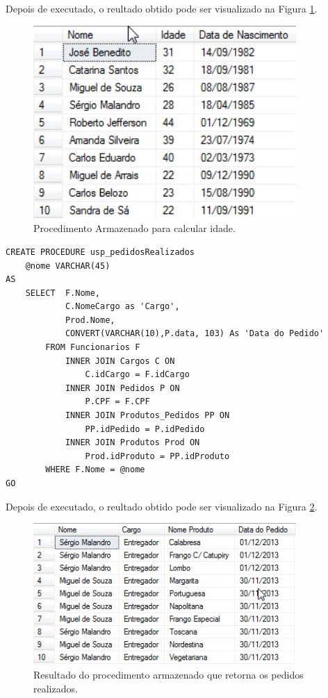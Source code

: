 \documentclass[
	12pt,				%
	openright,			%
	oneside,			%
	a4paper,			%
	chapter=TITLE,		%
	section=TITLE,		%
	english,			%
	brazil				%
	]{abntex2}
\begin{document}
    Depois de executado, o reultado obtido pode ser visualizado na Figura \ref{usp_001}.
    
    \begin{figure}[h]
         \centering
         \includegraphics[width=10cm,keepaspectratio]{Imgs/USP_001}
         \caption{Procedimento Armazenado para calcular idade.}
         \label{usp_001}
    \end{figure}
    
    \newpage
    
    \begin{lstlisting}
CREATE PROCEDURE usp_pedidosRealizados
	@nome VARCHAR(45)
AS
	SELECT  F.Nome, 
	        C.NomeCargo as 'Cargo', 
	        Prod.Nome, 
	        CONVERT(VARCHAR(10),P.data, 103) As 'Data do Pedido'  
        FROM Funcionarios F
            INNER JOIN Cargos C ON 
                C.idCargo = F.idCargo
            INNER JOIN Pedidos P ON 
                P.CPF = F.CPF
            INNER JOIN Produtos_Pedidos PP ON 
                PP.idPedido = P.idPedido
            INNER JOIN Produtos Prod ON 
                Prod.idProduto = PP.idProduto
        WHERE F.Nome = @nome     
GO
    \end{lstlisting}
    
    Depois de executado, o reultado obtido pode ser visualizado na Figura \ref{usp_002}.
    \begin{figure}[h]
         \centering
         \includegraphics[width=10cm,keepaspectratio]{Imgs/USP_002}
         \caption{Resultado do procedimento armazenado que retorna os pedidos realizados.}
         \label{usp_002}
    \end{figure}
    
\end{document}
